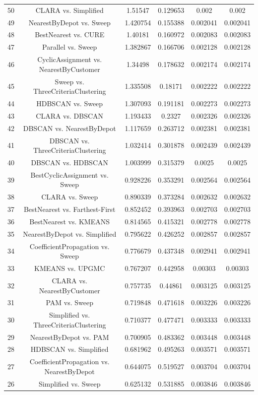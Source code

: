 \documentclass[a4paper,10pt]{article}
\begin{document}
\begin{landscape}
\begin{table}[!htp]
\begin{tabular}{cccccc}
50&CLARA vs. Simplified&1.51547&0.129653&0.002&0.002\\
49&NearestByDepot vs. Sweep&1.420754&0.155388&0.002041&0.002041\\
48&BestNearest vs. CURE&1.40181&0.160972&0.002083&0.002083\\
47&Parallel vs. Sweep&1.382867&0.166706&0.002128&0.002128\\
46&CyclicAssignment vs. NearestByCustomer&1.34498&0.178632&0.002174&0.002174\\
45&Sweep vs. ThreeCriteriaClustering&1.335508&0.18171&0.002222&0.002222\\
44&HDBSCAN vs. Sweep&1.307093&0.191181&0.002273&0.002273\\
43&CLARA vs. DBSCAN&1.193433&0.2327&0.002326&0.002326\\
42&DBSCAN vs. NearestByDepot&1.117659&0.263712&0.002381&0.002381\\
41&DBSCAN vs. ThreeCriteriaClustering&1.032414&0.301878&0.002439&0.002439\\
40&DBSCAN vs. HDBSCAN&1.003999&0.315379&0.0025&0.0025\\
39&BestCyclicAssignment vs. Sweep&0.928226&0.353291&0.002564&0.002564\\
38&CLARA vs. Sweep&0.890339&0.373284&0.002632&0.002632\\
37&BestNearest vs. Farthest-First&0.852452&0.393963&0.002703&0.002703\\
36&BestNearest vs. KMEANS&0.814565&0.415321&0.002778&0.002778\\
35&NearestByDepot vs. Simplified&0.795622&0.426252&0.002857&0.002857\\
34&CoefficientPropagation vs. Sweep&0.776679&0.437348&0.002941&0.002941\\
33&KMEANS vs. UPGMC&0.767207&0.442958&0.00303&0.00303\\
32&CLARA vs. NearestByCustomer&0.757735&0.44861&0.003125&0.003125\\
31&PAM vs. Sweep&0.719848&0.471618&0.003226&0.003226\\
30&Simplified vs. ThreeCriteriaClustering&0.710377&0.477471&0.003333&0.003333\\
29&NearestByDepot vs. PAM&0.700905&0.483362&0.003448&0.003448\\
28&HDBSCAN vs. Simplified&0.681962&0.495263&0.003571&0.003571\\
27&CoefficientPropagation vs. NearestByDepot&0.644075&0.519527&0.003704&0.003704\\
26&Simplified vs. Sweep&0.625132&0.531885&0.003846&0.003846\\

\end{tabular}
\end{table}
\end{landscape}
\end{document}

